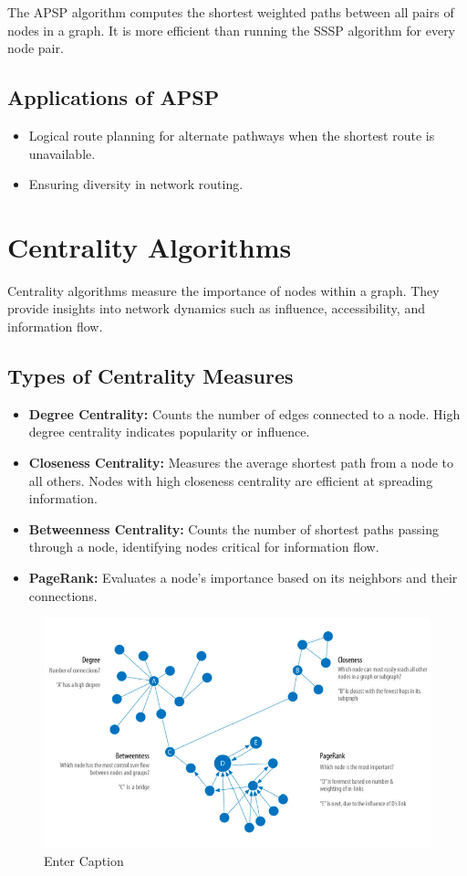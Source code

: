 The APSP algorithm computes the shortest weighted paths between all pairs of nodes in a graph. It is more efficient than running the SSSP algorithm for every node pair. 

\subsection{Applications of APSP}
\begin{itemize}
    \item Logical route planning for alternate pathways when the shortest route is unavailable.
    \item Ensuring diversity in network routing.
\end{itemize}

\section{Centrality Algorithms}

Centrality algorithms measure the importance of nodes within a graph. They provide insights into network dynamics such as influence, accessibility, and information flow.

\subsection{Types of Centrality Measures}
\begin{itemize}
    \item \textbf{Degree Centrality:} Counts the number of edges connected to a node. High degree centrality indicates popularity or influence.
    \item \textbf{Closeness Centrality:} Measures the average shortest path from a node to all others. Nodes with high closeness centrality are efficient at spreading information.
    \item \textbf{Betweenness Centrality:} Counts the number of shortest paths passing through a node, identifying nodes critical for information flow.
    \item \textbf{PageRank:} Evaluates a node's importance based on its neighbors and their connections.
\end{itemize}

\begin{figure}[H]
    \centering
    \includegraphics[width=0.75\linewidth]{centrality algorithms.png}
    \caption{Enter Caption}
    \label{fig:enter-label}
\end{figure}

